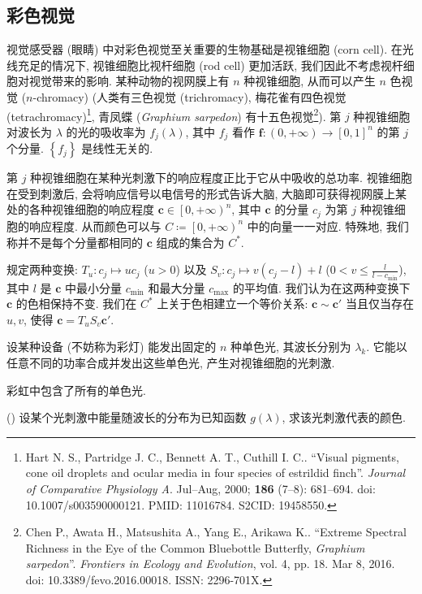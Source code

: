 \documentclass{article}
\newcounter{para}
\newcommand\mypara{\par\refstepcounter{para}(\thepara)\space}
\begin{document}
\subsection{彩色视觉}

视觉感受器 (眼睛) 中对彩色视觉至关重要的生物基础是视锥细胞 (corn cell).
在光线充足的情况下, 视锥细胞比视杆细胞 (rod cell) 更加活跃,
我们因此不考虑视杆细胞对视觉带来的影响.
某种动物的视网膜上有 $n$ 种视锥细胞, 从而可以产生 $n$ 色视觉 ($n$-chromacy)
(人类有三色视觉 (trichromacy),
梅花雀有四色视觉 (tetrachromacy)\footnote{
	Hart N. S., Partridge J. C., Bennett A. T., Cuthill I. C.\@.
	``Visual pigments, cone oil droplets and ocular media in four species of estrildid finch''.
	\textit{Journal of Comparative Physiology A}.
	Jul--Aug, 2000; \textbf{186} (7--8): 681--694.
	doi: 10.1007/s003590000121. PMID: 11016784. S2CID: 19458550.
},
青凤蝶 (\textit{Graphium sarpedon}) 有十五色视觉\footnote{
	Chen P., Awata H., Matsushita A., Yang E., Arikawa K.\@.
	``Extreme Spectral Richness in the Eye of the Common Bluebottle Butterfly, \textit{Graphium sarpedon}''.
	\textit{Frontiers in Ecology and Evolution}, vol. 4, pp. 18. Mar 8, 2016.
	doi: 10.3389/fevo.2016.00018. ISSN: 2296-701X.
}).
第 $j$ 种视锥细胞对波长为 $\lambda$ 的光的吸收率为 $f_j\!\left(\lambda\right)$,
其中 $f_j$ 看作 $\mathbf f:\left(0,+\infty\right)\to\left[0,1\right]^n$ 的第 $j$ 个分量.
$\left\{f_j\right\}$ 是线性无关的.

第 $j$ 种视锥细胞在某种光刺激下的响应程度正比于它从中吸收的总功率.
视锥细胞在受到刺激后, 会将响应信号以电信号的形式告诉大脑,
大脑即可获得视网膜上某处的各种视锥细胞的响应程度 $\mathbf c\in\left[0,+\infty\right)^n$,
其中 $\mathbf c$ 的分量 $c_j$ 为第 $j$ 种视锥细胞的响应程度.
从而颜色可以与 $C\coloneqq \left[0,+\infty\right)^n$ 中的向量一一对应.
特殊地, 我们称并不是每个分量都相同的 $\mathbf c$ 组成的集合为 $C^*$.

规定两种变换: $T_u:c_j\mapsto uc_j$ ($u>0$)
以及 $S_v:c_j\mapsto v\left(c_j-l\right)+l$ ($0<v\le\frac l{l-c_{\min}}$),
其中 $l$ 是 $\mathbf c$ 中最小分量 $c_{\min}$ 和最大分量 $c_{\max}$ 的平均值.
我们认为在这两种变换下 $\mathbf c$ 的色相保持不变.
我们在 $C^*$ 上关于色相建立一个等价关系: $\mathbf c\sim\mathbf c'$
当且仅当存在 $u,v$, 使得 $\mathbf c=T_uS_v\mathbf c'$.

设某种设备 (不妨称为彩灯) 能发出固定的 $n$ 种单色光, 其波长分别为 $\lambda_k$.
它能以任意不同的功率合成并发出这些单色光, 产生对视锥细胞的光刺激.

彩虹中包含了所有的单色光.

\mypara
设某个光刺激中能量随波长的分布为已知函数 $g\!\left(\lambda\right)$,
求该光刺激代表的颜色.
\end{document}
